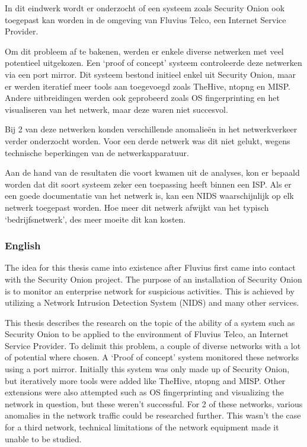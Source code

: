 \documentclass[a4paper,12pt]{report}
\begin{document}
In dit eindwerk wordt er onderzocht of een systeem zoals Security Onion ook toegepast kan worden in de omgeving van Fluvius Telco, een Internet Service Provider.

Om dit probleem af te bakenen, werden er enkele diverse netwerken met veel potentieel uitgekozen.
Een `proof of concept' systeem controleerde deze netwerken via een port mirror.
Dit systeem bestond initieel enkel uit Security Onion, maar er werden iteratief meer tools aan toegevoegd zoals TheHive, ntopng en MISP.
Andere uitbreidingen werden ook geprobeerd zoals OS fingerprinting en het visualiseren van het netwerk, maar deze waren niet succesvol.

Bij 2 van deze netwerken konden verschillende anomalieën in het netwerkverkeer verder onderzocht worden.
Voor een derde netwerk was dit niet gelukt, wegens technische beperkingen van de netwerkapparatuur.

Aan de hand van de resultaten die voort kwamen uit de analyses, kon er bepaald worden dat dit soort systeem zeker een toepassing heeft binnen een ISP.
Als er een goede documentatie van het netwerk is, kan een NIDS waarschijnlijk op elk netwerk toegepast worden.
Hoe meer dit netwerk afwijkt van het typisch `bedrijfsnetwerk', des meer moeite dit kan kosten.

\subsubsection{English}
The idea for this thesis came into existence after Fluvius first came into contact with the Security Onion project.
The purpose of an installation of Security Onion is to monitor an enterprise network for suspicious activities.
This is achieved by utilizing a Network Intrusion Detection System (NIDS) and many other services.

This thesis describes the research on the topic of the ability of a system such as Security Onion to be applied to the environment of Fluvius Telco, an Internet Service Provider.
To delimit this problem, a couple of diverse networks with a lot of potential where chosen.
A `Proof of concept' system monitored these networks using a port mirror.
Initially this system was only made up of Security Onion, but iteratively more tools were added like TheHive, ntopng and MISP.
Other extensions were also attempted such as OS fingerprinting and visualizing the network in question, but these weren't successful.
For 2 of these networks, various anomalies in the network traffic could be researched further.
This wasn't the case for a third network, technical limitations of the network equipment made it unable to be studied.
\end{document}
